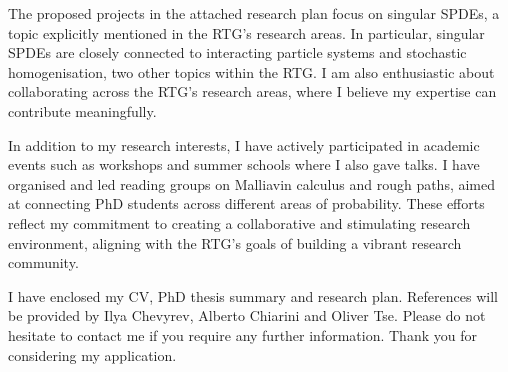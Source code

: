 \documentclass[12pt,a4paper]{moderncv}
\begin{document}


The proposed projects in the attached research plan focus on singular SPDEs, a topic explicitly mentioned in the RTG's research areas. In particular, singular SPDEs are closely connected to interacting particle systems and stochastic homogenisation, two other topics within the RTG. I am also enthusiastic about collaborating across the RTG’s research areas, where I believe my expertise can contribute meaningfully.

In addition to my research interests, I have actively participated in academic events such as workshops and summer schools where I also gave talks. I have organised and led reading groups on Malliavin calculus and rough paths, aimed at connecting PhD students across different areas of probability. These efforts reflect my commitment to creating a collaborative and stimulating research environment, aligning with the RTG’s goals of building a vibrant research community. %




I have enclosed my CV, PhD thesis summary and research plan. References will be provided by Ilya Chevyrev, Alberto Chiarini and Oliver  Tse. Please do not hesitate to contact me if you require any further information. Thank you for considering my application. %






\vspace{0.5cm}

\makeletterclosing
\end{document}

